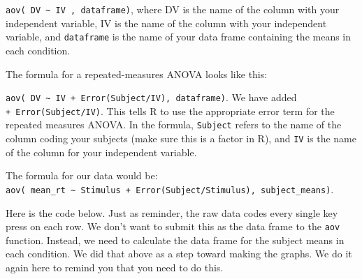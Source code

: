 \documentclass[
]{book}
\begin{document}
\texttt{aov(\ DV\ \textasciitilde{}\ IV\ ,\ dataframe)}, where DV is the name of the column with your independent variable, IV is the name of the column with your independent variable, and \texttt{dataframe} is the name of your data frame containing the means in each condition.

The formula for a repeated-measures ANOVA looks like this:

\texttt{aov(\ DV\ \textasciitilde{}\ IV\ +\ Error(Subject/IV),\ dataframe)}. We have added \texttt{+\ Error(Subject/IV)}. This tells R to use the appropriate error term for the repeated measures ANOVA. In the formula, \texttt{Subject} refers to the name of the column coding your subjects (make sure this is a factor in R), and \texttt{IV} is the name of the column for your independent variable.

The formula for our data would be: \texttt{aov(\ mean\_rt\ \textasciitilde{}\ Stimulus\ +\ Error(Subject/Stimulus),\ subject\_means)}.

Here is the code below. Just as reminder, the raw data codes every single key press on each row. We don't want to submit this as the data frame to the \texttt{aov} function. Instead, we need to calculate the data frame for the subject means in each condition. We did that above as a step toward making the graphs. We do it again here to remind you that you need to do this.
\end{document}
